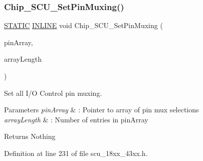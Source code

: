 \subsubsection{\texorpdfstring{Chip\+\_\+\+S\+C\+U\+\_\+\+Set\+Pin\+Muxing()}{Chip\_SCU\_SetPinMuxing()}}
{\footnotesize\ttfamily \hyperlink{group___l_p_c___types___public___macros_ga10b2d890d871e1489bb02b7e70d9bdfb}{S\+T\+A\+T\+IC} \hyperlink{spifi__18xx__43xx_8h_a2eb6f9e0395b47b8d5e3eeae4fe0c116}{I\+N\+L\+I\+NE} void Chip\+\_\+\+S\+C\+U\+\_\+\+Set\+Pin\+Muxing (\begin{DoxyParamCaption}\item[{const \hyperlink{struct_p_i_n_m_u_x___g_r_p___t}{P\+I\+N\+M\+U\+X\+\_\+\+G\+R\+P\+\_\+T} $\ast$}]{pin\+Array,  }\item[{uint32\+\_\+t}]{array\+Length }\end{DoxyParamCaption})}



Set all I/O Control pin muxing. 


\begin{DoxyParams}{Parameters}
{\em pin\+Array} & \+: Pointer to array of pin mux selections \\
\hline
{\em array\+Length} & \+: Number of entries in pin\+Array \\
\hline
\end{DoxyParams}
\begin{DoxyReturn}{Returns}
Nothing 
\end{DoxyReturn}


Definition at line 231 of file scu\+\_\+18xx\+\_\+43xx.\+h.

